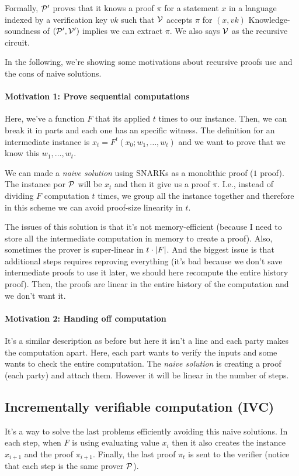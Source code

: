   Formally, $\mathcal{P}'$ proves that it knows a proof $\pi$ for a statement $x$
  in a language indexed by a verification key $vk$
  such that $\mathcal{V}$ accepts $\pi$ for $(x, vk)$
  Knowledge-soundness of $(\mathcal{P}',\mathcal{V}')$ implies we can extract $\pi$.
  We also says $\mathcal{V}$ as the recursive circuit.

  In the following, we're showing some motivations about recursive proofs use and 
  the cons of naive solutions.

  \paragraph{Motivation 1: Prove sequential computations}
  Here, we've a function $F$ that its applied $t$ times to our instance.
  Then, we can break it in parts and each one has an specific witness.
  The definition for an intermediate instance is $x_t = F^t(x_0;w_1,\dots,w_t)$ and we want 
  to prove that we know this $w_1,\dots,w_t$.

  We can made a \textit{naive solution} using SNARKs as a monolithic proof ($1$ proof).
  The instance por $\mathcal{P}$ will be $x_t$ and then it give us a proof $\pi$.
  I.e., instead of dividing $F$ computation $t$ times, we group all the instance 
  together and therefore in this scheme we can avoid proof-size linearity in $t$.

  The issues of this solution is that it's not memory-efficient (because I need to store all the 
  intermediate computation in memory to create a proof).
  Also, sometimes the prover is super-linear in $t \cdot \left| F \right|$.
  And the biggest issue is that additional steps requires reproving everything (it's bad because 
  we don't save intermediate proofs to use it later, we should here recompute the entire history
  proof). Then, the proofs are linear in the entire history of the computation and we don't want 
  it.

  \paragraph{Motivation 2: Handing off computation}
  It's a similar description as before but here it isn't a line and each party makes 
  the computation apart.
  Here, each part wants to verify the inputs and some wants to check the entire computation.
  The \textit{naive solution} is creating a proof (each party) and attach them.
  However it will be linear in the number of steps.

  \subsection{Incrementally verifiable computation (IVC)}
  It's a way to solve the last problems efficiently avoiding this naive solutions.
  In each step, when $F$ is using evaluating value $x_i$ then it also creates the
  instance $x_{i+1}$ and the proof $\pi_{i+1}$.
  Finally, the last proof $\pi_t$ is sent to the verifier (notice that each step is 
  the same prover $\mathcal{P}$).

